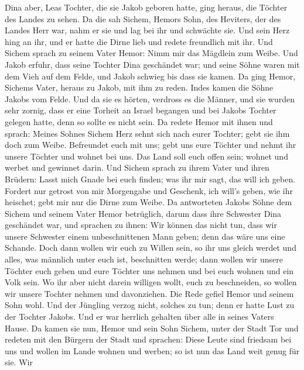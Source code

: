 Dina aber, Leas Tochter, die sie Jakob geboren hatte, ging heraus, die
Töchter des Landes zu sehen.  Da die sah Sichem, Hemors
Sohn, des Heviters, der des Landes Herr war, nahm er sie und lag bei ihr
und schwächte sie.  Und sein Herz hing an ihr, und er hatte
die Dirne lieb und redete freundlich mit ihr.  Und Sichem
sprach zu seinem Vater Hemor: Nimm mir das Mägdlein zum Weibe.
 Und Jakob erfuhr, dass seine Tochter Dina geschändet war;
und seine Söhne waren mit dem Vieh auf dem Felde, und Jakob schwieg bis
dass sie kamen.  Da ging Hemor, Sichems Vater, heraus zu
Jakob, mit ihm zu reden.  Indes kamen die Söhne Jakobs vom
Felde. Und da sie es hörten, verdross es die Männer, und sie wurden sehr
zornig, dass er eine Torheit an Israel begangen und bei Jakobs Tochter
gelegen hatte, denn so sollte es nicht sein.  Da redete
Hemor mit ihnen und sprach: Meines Sohnes Sichem Herz sehnt sich nach
eurer Tochter; gebt sie ihm doch zum Weibe.  Befreundet euch
mit uns; gebt uns eure Töchter und nehmt ihr unsere Töchter
 und wohnet bei uns. Das Land soll euch offen sein; wohnet
und werbet und gewinnet darin.  Und Sichem sprach zu ihrem
Vater und ihren Brüdern: Lasst mich Gnade bei euch finden; was ihr mir
sagt, das will ich geben.  Fordert nur getrost von mir
Morgengabe und Geschenk, ich will's geben, wie ihr heischet; gebt mir
nur die Dirne zum Weibe.  Da antworteten Jakobs Söhne dem
Sichem und seinem Vater Hemor betrüglich, darum dass ihre Schwester Dina
geschändet war,  und sprachen zu ihnen: Wir können das
nicht tun, dass wir unsere Schwester einem unbeschnittenen Mann geben;
denn das wäre uns eine Schande.  Doch dann wollen wir euch
zu Willen sein, so ihr uns gleich werdet und alles, was männlich unter
euch ist, beschnitten werde;  dann wollen wir unsere
Töchter euch geben und eure Töchter uns nehmen und bei euch wohnen und
ein Volk sein.  Wo ihr aber nicht darein willigen wollt,
euch zu beschneiden, so wollen wir unsere Tochter nehmen und
davonziehen.  Die Rede gefiel Hemor und seinem Sohn wohl.
 Und der Jüngling verzog nicht, solches zu tun; denn er
hatte Lust zu der Tochter Jakobs. Und er war herrlich gehalten über alle
in seines Vaters Hause.  Da kamen sie nun, Hemor und sein
Sohn Sichem, unter der Stadt Tor und redeten mit den Bürgern der Stadt
und sprachen:  Diese Leute sind friedsam bei uns und wollen
im Lande wohnen und werben; so ist nun das Land weit genug für sie. Wir
